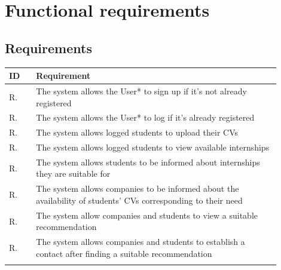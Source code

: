 
\section{Functional requirements}\label{sec:functional-requirements}
\subsection{Requirements}\label{subsec:requirements}
\setcounter{req}{1}
\newcommand{\creq}{\thereq\stepcounter{req}}

\begin{center}
    \begin{longtable}{|l|p{0.90\linewidth}|}
        \hline\rowcolor[HTML]{FFDAB9} %
        \textbf{ID} & \textbf{Requirement} \\ \hline
        \rowcolor[HTML]{FFFFFF} %
        R\creq.& The system allows the User* to sign up if it's not already registered \\ \hline
        \rowcolor[HTML]{F0F0F0} %
        R\creq.& The system allows the User* to log if it's already registered \\ \hline
        \rowcolor[HTML]{F0F0F0} %
        R\creq.& The system allows logged students to upload their CVs \\ \hline
        \rowcolor[HTML]{FFFFFF} %
        R\creq.& The system allows logged students to view available internships  \\ \hline
        \rowcolor[HTML]{F0F0F0} %
        R\creq.& The system allows students to be informed about internships they are suitable for \\ \hline
        \rowcolor[HTML]{FFFFFF} %
        R\creq.& The system allows companies to be informed about the availability of students' CVs corresponding to their need \\ \hline
        \rowcolor[HTML]{F0F0F0} %
        R\creq.& The system allow companies and students to view a suitable recommendation \\ \hline
        \rowcolor[HTML]{FFFFFF} %
        R\creq.& The system allows companies and students to establish a contact after finding a suitable recommendation \\ \hline
        \rowcolor[HTML]{F0F0F0} %

\end{longtable}
\end{center}
